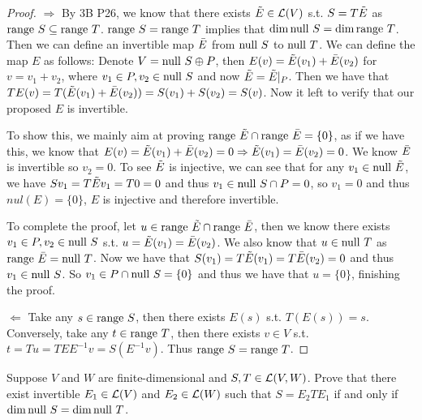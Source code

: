 \documentclass{extarticle}
\begin{document}
\begin{proof}
\(\Rightarrow\) By 3B P26, we know that there exists \(\Tilde{E} \in \mathcal{L}(V)\) s.t. \(S = T \Tilde{E}\) as 
\(\text{range } S \subseteq \text{range } T\). \(\text{range } S = \text{range } T\) implies that \(\dim \text{null } S = \dim \text{range } T\). 
Then we can define an invertible map \(\bar{E}\) from \(\text{null } S\) to \(\text{null } T\). We can define the map \(E\) as follows:
Denote \(V = \text{null } S \oplus P\), then \(E(v) = \Tilde{E}(v_1) + \bar{E}(v_2)\) for \(v = v_1 + v_2\), where 
\(v_1 \in P, v_2 \in \text{null } S\) and now \(\Tilde{E} = \Tilde{E} |_P\). Then we have that \(TE(v) = T(\Tilde{E}(v_1) + \bar{E}(v_2)) = S(v_1)
+ S(v_2) = S(v)\). Now it left to verify that our proposed \(E\) is invertible. 

To show this, we mainly aim at proving \(\text{range } \tilde{E} \cap \text{range } \bar{E} = \{0\}\), as if we have this, we 
know that \(E(v) = \Tilde{E}(v_1) + \bar{E}(v_2) = 0 \Rightarrow \Tilde{E}(v_1) = \bar{E}(v_2) = 0\). We know \(\bar{E}\) is 
invertible so \(v_2 = 0\). To see \(\Tilde{E}\) is injective, we can see that for any \(v_1 \in \text{null } \Tilde{E}\), we 
have \(S v_1 = T \Tilde{E} v_1 = T 0 = 0\) and thus \(v_1 \in \text{null } S \cap P = 0\), so \(v_1 = 0\) and thus 
\(nul (E) = \{0\}\), \(E\) is injective and therefore invertible. 

To complete the proof, let \(u \in \text{range } \Tilde{E} \cap \text{range } \bar{E}\), then we know there exists 
\(v_1 \in P, v_2 \in \text{null } S\) s.t. \(u = \Tilde{E}(v_1) = \bar{E}(v_2)\). We also know that \(u \in \text{null } T\)
as \(\text{range } \bar{E} = \text{null } T\). Now we have that \(S (v_1) = T \Tilde{E}(v_1) = T \bar{E}(v_2) = 0\) and thus 
\(v_1 \in \text{null } S\). So \(v_1 \in  P \cap \text{null } S = \{0\}\) and thus we have that \(u = \{0\}\), finishing 
the proof.




\(\Leftarrow\) Take any \(s \in \text{range } S\), then there exists \(E(s)\) s.t. \(T(E(s)) = s\). Conversely, 
take any \(t \in \text{range } T\), then there exists \(v \in V\) s.t. \(t = Tu = TE E^{-1}v = S (E^{-1}v)\). 
Thus \(\text{range } S = \text{range } T\). 

\end{proof}


\begin{problem}{8}
    Suppose \(V\) and \(W\) are finite-dimensional and \(S, T \in \mathcal{L}(V, W)\). Prove that 
    there exist invertible \(E_1 \in \mathcal{L}(V)\) and \(E_2 \in \mathcal{L}(W)\) such that 
    \(S = E_2 T E_1\) if and only if \(\dim \text{null } S = \dim \text{null } T\). 
\end{problem}
\end{document}
